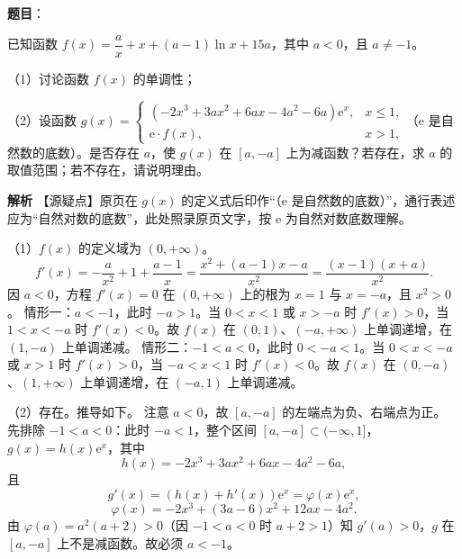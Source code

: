 \begin{answer}

\textbf{题目}：

已知函数 $f(x)=\dfrac ax+x+(a-1)\ln x+15a$，其中 $a<0$，且 $a\neq-1$。

（1）讨论函数 $f(x)$ 的单调性；

（2）设函数 $g(x)=\begin{cases}\left(-2x^3+3ax^2+6ax-4a^2-6a\right)\mathrm e^x,&x\leqslant1,\\ \mathrm e\cdot f(x),&x>1,\end{cases}$（$\mathrm e$ 是自然数的底数）。是否存在 $a$，使 $g(x)$ 在 $[a,-a]$ 上为减函数？若存在，求 $a$ 的取值范围；若不存在，请说明理由。

\textbf{解析}
【源疑点】原页在 $g(x)$ 的定义式后印作“（$\mathrm e$ 是自然数的底数）”，通行表述应为“自然对数的底数”，此处照录原页文字，按 $\mathrm e$ 为自然对数底数理解。

（1）$f(x)$ 的定义域为 $(0,+\infty)$。
\nopagebreak[4]
\[f'(x)=-\frac{a}{x^2}+1+\frac{a-1}{x}=\frac{x^2+(a-1)x-a}{x^2}=\frac{(x-1)(x+a)}{x^2}.\]
因 $a<0$，方程 $f'(x)=0$ 在 $(0,+\infty)$ 上的根为 $x=1$ 与 $x=-a$，且 $x^2>0$。
情形一：$a<-1$，此时 $-a>1$。当 $0<x<1$ 或 $x>-a$ 时 $f'(x)>0$，当 $1<x<-a$ 时 $f'(x)<0$。故 $f(x)$ 在 $(0,1)$、$(-a,+\infty)$ 上单调递增，在 $(1,-a)$ 上单调递减。
情形二：$-1<a<0$，此时 $0<-a<1$。当 $0<x<-a$ 或 $x>1$ 时 $f'(x)>0$，当 $-a<x<1$ 时 $f'(x)<0$。故 $f(x)$ 在 $(0,-a)$、$(1,+\infty)$ 上单调递增，在 $(-a,1)$ 上单调递减。

（2）存在。推导如下。
注意 $a<0$，故 $[a,-a]$ 的左端点为负、右端点为正。
先排除 $-1<a<0$：此时 $-a<1$，整个区间 $[a,-a]\subset(-\infty,1]$，$g(x)=h(x)\mathrm e^x$，其中
\nopagebreak[4]
\[h(x)=-2x^3+3ax^2+6ax-4a^2-6a,\]
且
\nopagebreak[4]
\[g'(x)=\left(h(x)+h'(x)\right)\mathrm e^x=\varphi(x)\mathrm e^x,\]
\nopagebreak[4]
\[\varphi(x)=-2x^3+(3a-6)x^2+12ax-4a^2.\]
由 $\varphi(a)=a^2(a+2)>0$（因 $-1<a<0$ 时 $a+2>1$）知 $g'(a)>0$，$g$ 在 $[a,-a]$ 上不是减函数。故必须 $a<-1$。


\end{answer}
